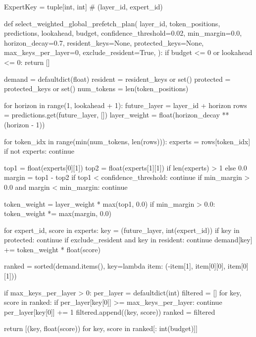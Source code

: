 \begin{CodeBlock}
ExpertKey = tuple[int, int]  # (layer_id, expert_id)


def select_weighted_global_prefetch_plan(
    layer_id,
    token_positions,
    predictions,
    lookahead,
    budget,
    confidence_threshold=0.02,
    min_margin=0.0,
    horizon_decay=0.7,
    resident_keys=None,
    protected_keys=None,
    max_keys_per_layer=0,
    exclude_resident=True,
):
    if budget <= 0 or lookahead <= 0:
        return []

    demand = defaultdict(float)
    resident = resident_keys or set()
    protected = protected_keys or set()
    num_tokens = len(token_positions)

    for horizon in range(1, lookahead + 1):
        future_layer = layer_id + horizon
        rows = predictions.get(future_layer, [])
        layer_weight = float(horizon_decay ** (horizon - 1))

        for token_idx in range(min(num_tokens, len(rows))):
            experts = rows[token_idx]
            if not experts:
                continue

            top1 = float(experts[0][1])
            top2 = float(experts[1][1]) if len(experts) > 1 else 0.0
            margin = top1 - top2
            if top1 < confidence_threshold:
                continue
            if min_margin > 0.0 and margin < min_margin:
                continue

            token_weight = layer_weight * max(top1, 0.0)
            if min_margin > 0.0:
                token_weight *= max(margin, 0.0)

            for expert_id, score in experts:
                key = (future_layer, int(expert_id))
                if key in protected:
                    continue
                if exclude_resident and key in resident:
                    continue
                demand[key] += token_weight * float(score)

    ranked = sorted(demand.items(), key=lambda item: (-item[1], item[0][0], item[0][1]))

    if max_keys_per_layer > 0:
        per_layer = defaultdict(int)
        filtered = []
        for key, score in ranked:
            if per_layer[key[0]] >= max_keys_per_layer:
                continue
            per_layer[key[0]] += 1
            filtered.append((key, score))
        ranked = filtered

    return [(key, float(score)) for key, score in ranked[: int(budget)]]

\end{CodeBlock}

